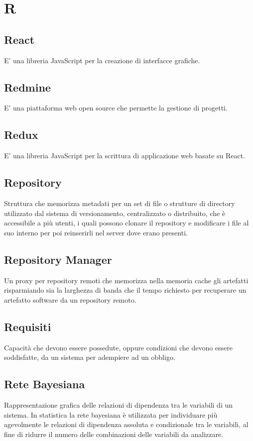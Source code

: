 \section*{R}

\subsection{React}
E' una libreria JavaScript per la creazione di interfacce grafiche.

\subsection{Redmine}
E' una piattaforma web open source che permette la gestione di progetti.

\subsection{Redux}
E' una libreria JavaScript per la scrittura di applicazione web basate su React.

\subsection{Repository}
Struttura che memorizza metadati per un set di file o strutture di directory utilizzato dal sistema di versionamento, centralizzato o distribuito, che è accessibile a più utenti, i quali possono clonare il repository e modificare i file al suo interno per poi reinserirli nel server dove erano presenti.

\subsection{Repository Manager}
Un proxy per repository remoti che memorizza nella memoria cache gli artefatti risparmiando sia la larghezza di banda che il tempo richiesto per recuperare un artefatto software da un repository remoto.

\subsection{Requisiti}
Capacità che devono essere possedute, oppure condizioni che devono essere soddisfatte, da un sistema per adempiere ad un obbligo.

\subsection{Rete Bayesiana}
Rappresentazione grafica delle relazioni di dipendenza tra le variabili di un sistema. In statistica la rete bayesiana è utilizzata per individuare più agevolmente le relazioni di dipendenza assoluta e condizionale tra le variabili, al fine di ridurre il numero delle combinazioni delle variabili da analizzare.